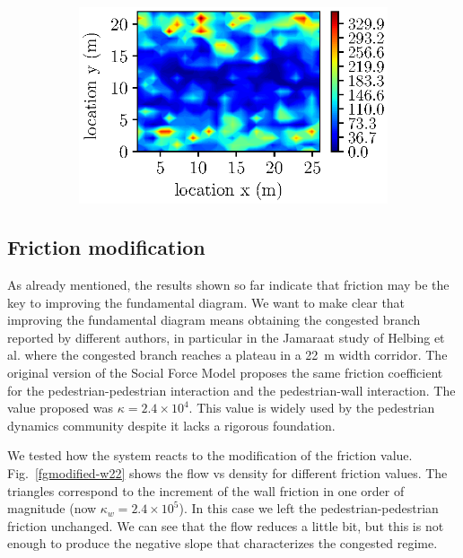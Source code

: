 \begin{figure}[htbp!]
\begin{subfigure}[b]{0.475\columnwidth}
            \label{abswg_width15}
        \end{subfigure}
        \begin{subfigure}[b]{0.475\columnwidth}   
            \centering 
            \caption{}            
            \includegraphics[width=\textwidth]{plots/abswg_width22.eps}
        
            \label{abswg_width22}
           \end{subfigure}        
 \caption{} 
 \label{abswg}

\end{figure}


\subsection{Friction modification}

As already mentioned, the results shown so far indicate that friction may be the key to improving the fundamental diagram. We want to make clear that improving the fundamental diagram means obtaining the congested branch reported by different authors, in particular in the Jamaraat study of Helbing et al. where the congested branch reaches a plateau in a 22~m width corridor. The original version of the Social Force Model proposes the same friction coefficient for the pedestrian-pedestrian interaction and the pedestrian-wall interaction. The value proposed was $\kappa = 2.4\times10^{4}$. This value is widely used by the pedestrian dynamics community despite it lacks a rigorous foundation. 

We tested how the system reacts to the modification of the friction value. Fig.~\ref{fgmodified-w22} shows the flow vs density for different friction values. The triangles correspond to the increment of the wall friction in one order of magnitude (now $\kappa_w = 2.4\times10^{5}$). In this case we left the pedestrian-pedestrian friction unchanged. We can see that the flow reduces a little bit, but this is not enough to produce the negative slope that characterizes the congested regime. 

